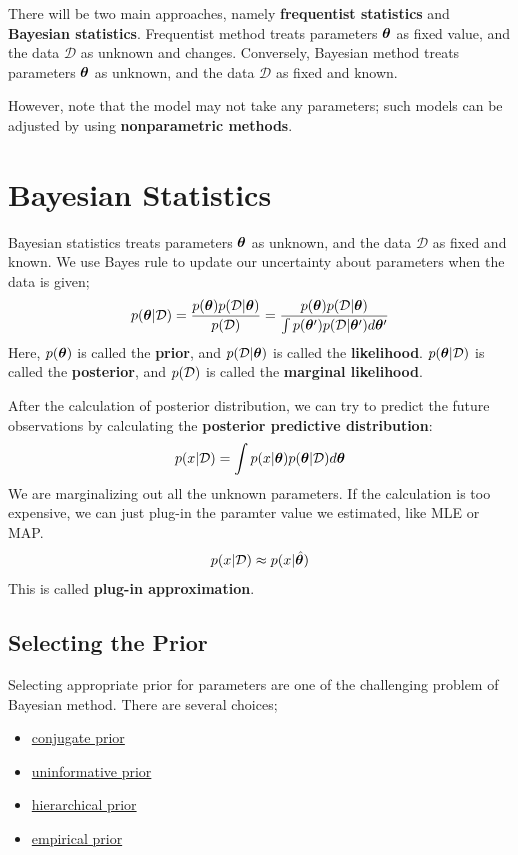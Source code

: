 \documentclass{report}
\begin{document}
There will be two main approaches, namely \textbf{frequentist statistics} and \textbf{Bayesian statistics}.
Frequentist method treats parameters $\boldsymbol{\theta}$ as fixed value, and the data  $\mathcal D$ as unknown and changes.
Conversely, Bayesian method treats parameters $\boldsymbol{\theta}$ as unknown, and the data  $\mathcal D$ as fixed and known.


However, note that the model may not take any parameters; such models can be adjusted by using \textbf{nonparametric methods}.

    \section{Bayesian Statistics}
    Bayesian statistics treats parameters $\boldsymbol{\theta}$ as unknown, and the data $\mathcal D$ as fixed and known.
    We use Bayes rule to update our uncertainty about parameters when the data is given;
    \[
    p(\boldsymbol{\theta}|\mathcal D) =
    \dfrac
    {p(\boldsymbol{\theta}) p(\mathcal D|\boldsymbol{\theta})}
    {p(\mathcal D)} =
    \dfrac
    {p(\boldsymbol{\theta}) p(\mathcal D|\boldsymbol{\theta})}
    {\int p(\boldsymbol{\theta}') p(\mathcal D|\boldsymbol{\theta}') d\boldsymbol{\theta}'}
    \]
    Here, $p(\boldsymbol{\theta})$ is called the \textbf{prior}, and $p(\mathcal D|\boldsymbol{\theta})$ is called the \textbf{likelihood}.
    $p(\boldsymbol{\theta}|\mathcal D)$ is called the \textbf{posterior}, and $p(\mathcal D)$ is called the \textbf{marginal likelihood}.

    After the calculation of posterior distribution, we can try to predict the future observations by calculating the \textbf{posterior predictive distribution}:
    \[
    p(x|\mathcal D) = \int p(x|\boldsymbol{\theta})p(\boldsymbol{\theta}|\mathcal D)d\boldsymbol{\theta}
    \]
    We are marginalizing out all the unknown parameters.
    If the calculation is too expensive, we can just plug-in the paramter value we estimated, like MLE or MAP.
    \[
    p(x|\mathcal D) \approx p(x|\hat{\boldsymbol{\theta}})
    \]
    This is called \textbf{plug-in approximation}.

        \subsection{Selecting the Prior}
        Selecting appropriate prior for parameters are one of the challenging problem of Bayesian method.
        There are several choices;
        \begin{itemize}
            \item \hyperref[sec:ConjugatePrior]{conjugate prior}
            \item \hyperref[sec:UninformativePrior]{uninformative prior}
            \item \hyperref[sec:HierPrior]{hierarchical prior}
            \item \hyperref[sec:EmpPrior]{empirical prior}
        \end{itemize}
    
\end{document}
